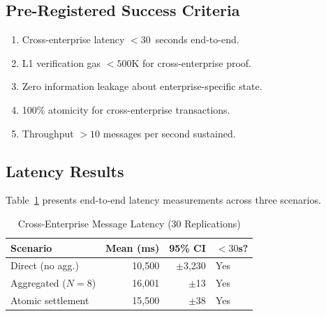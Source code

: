 \documentclass[conference]{IEEEtran}
\begin{document}
\subsection{Pre-Registered Success Criteria}

\begin{enumerate}
  \item Cross-enterprise latency $< 30$~seconds end-to-end.
  \item L1 verification gas $< 500$K for cross-enterprise proof.
  \item Zero information leakage about enterprise-specific state.
  \item 100\% atomicity for cross-enterprise transactions.
  \item Throughput $> 10$ messages per second sustained.
\end{enumerate}

\subsection{Latency Results}

Table~\ref{tab:latency} presents end-to-end latency measurements across
three scenarios.

\begin{table}[t]
  \centering
  \caption{Cross-Enterprise Message Latency (30 Replications)}
  \label{tab:latency}
  \begin{tabular}{@{}lrrl@{}}
    \toprule
    \textbf{Scenario} & \textbf{Mean (ms)} & \textbf{95\% CI} & \textbf{$<30$s?} \\
    \midrule
    Direct (no agg.) & 10,500 & $\pm$3,230 & Yes \\
    Aggregated ($N{=}8$) & 16,001 & $\pm$13 & Yes \\
    Atomic settlement & 15,500 & $\pm$38 & Yes \\
    \bottomrule
  \end{tabular}
\end{table}
\end{document}
